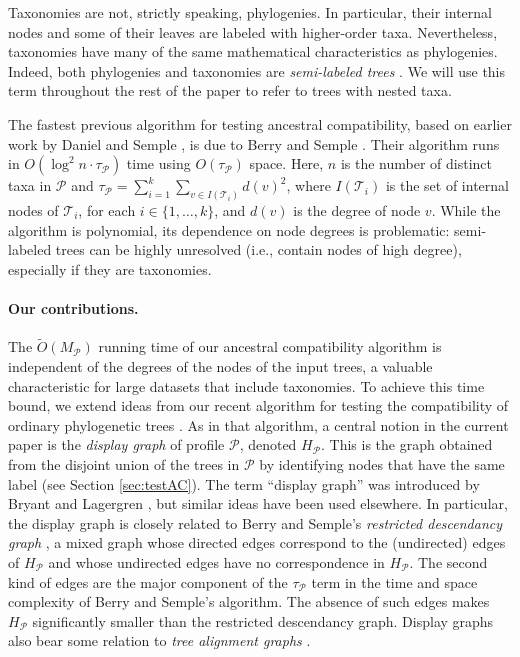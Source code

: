 \documentclass[11pt]{article}
\newcommand{\MP}{\ensuremath{M_\P}} \newcommand{\TG}{\ensuremath{\Gamma}} \newcommand{\incompatible}{\texttt{incompatible}}
\newcommand{\DG}{\ensuremath{H_\P}} \newcommand{\GBNT}{\ensuremath{G_{\mathtt{BNT}}}}
\renewcommand{\P}{\ensuremath{\mathcal{P}}}
\newcommand{\T}{\ensuremath{\mathcal{T}}}
\theoremstyle{definition}
\begin{document}
Taxonomies are not, strictly speaking, phylogenies.  In particular, their internal nodes and some of their leaves are labeled with higher-order taxa. Nevertheless, taxonomies have many of the same mathematical characteristics as phylogenies.  Indeed, both phylogenies and taxonomies are \emph{semi-labeled trees} \cite{BordewichEvansSemple2006,SempleSteel03}.  We will use this term throughout the rest of the paper to refer to trees with nested taxa.



The fastest previous algorithm for testing ancestral compatibility, based on earlier work by Daniel and Semple \cite{DanielSemple2004}, is due to Berry and Semple \cite{BerrySemple2006}. Their algorithm runs in $O \left (\log^2 n \cdot \tau_\P \right)$ time using $O \left ( \tau_\P \right)$ space. Here, $n$ is the number of distinct taxa in $\P$ and  $\tau_\P = \sum_{i = 1}^k \sum_{v \in I(\T_i)} d(v)^2$, where $I(\T_i)$ is the set of internal nodes of $\T_i$, for each $i \in \{1, \dots , k\}$, and $d(v)$ is the degree of node $v$.   While the algorithm is polynomial, its dependence on node degrees is problematic:  semi-labeled trees can be highly unresolved (i.e., contain nodes of high degree), especially if they are taxonomies.

\vspace{-1.5\parsep}

\paragraph{Our contributions.}
The $\tilde{O}(\MP)$ running time of our ancestral compatibility algorithm is independent of the degrees of the nodes of the input trees, a valuable characteristic for large datasets that include taxonomies.  To achieve this time bound, we extend ideas from our recent algorithm for testing the compatibility of ordinary phylogenetic trees \cite{DengFB2016}.   As in that algorithm, a central notion in the current paper is the \emph{display graph} of profile $\P$, denoted $\DG$.  This is the graph obtained from the disjoint union of the trees in $\P$ by identifying nodes that have the same label (see Section \ref{sec:testAC}).
The term ``display graph'' was introduced by Bryant and Lagergren  \cite{BryantLagergren06}, but similar ideas have been used elsewhere.  In particular, the display graph is closely related to Berry and Semple's \emph{restricted descendancy graph} \cite{BerrySemple2006}, a mixed graph whose directed edges correspond to the (undirected) edges of $\DG$ and whose undirected edges have no correspondence in $\DG$.  The second kind of edges are the major component of the $\tau_\P$ term in the time and space complexity of Berry and Semple's algorithm.  The absence of such edges makes $\DG$ significantly smaller than the restricted descendancy graph.  Display graphs also bear some relation to  \emph{tree alignment graphs} \cite{Smith:PloSCB:2013}.
\end{document}
